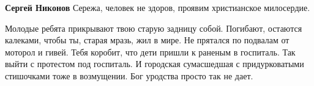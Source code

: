 \begin{itemize}
\begin{itemize}
\textbf{Сергей Никонов} Сережа, человек не здоров, проявим христианское милосердие.
\end{itemize} %


Молодые ребята прикрывают твою старую задницу собой. Погибают, остаются
калеками, чтобы ты, старая мразь, жил в мире. Не прятался по подвалам от
моторол и гивей. Тебя коробит, что дети пришли к раненым в госпиталь. Так выйти
с протестом под госпиталь. И городская сумасшедшая с придурковатыми стишочками
тоже в возмущении. Бог уродства просто так не дает.

\end{itemize} %
